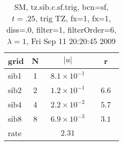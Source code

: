 \begin{table}[hbt]\tableFont %
\begin{center}
\begin{tabular}{|l|c|c|c|} \hline 
grid  & N &  $\vert u \vert$   & r \\ \hline 
                sib1 &     1 & ~$8.1\times10^{ -1}$~ &            \\ \hline
                sib2 &     2 & ~$1.2\times10^{ -1}$~ & ~$  6.6$~  \\ \hline
                sib4 &     4 & ~$2.2\times10^{ -2}$~ & ~$  5.7$~  \\ \hline
                sib8 &     8 & ~$6.9\times10^{ -3}$~ & ~$  3.1$~  \\ \hline
    rate             &       &       $2.31$         &        \\ \hline
\end{tabular}
\caption{SM, tz.sib.c.sf.trig, bcn=sf, $t=.25$, trig TZ, fx=1, fx=1, diss=.0, filter=1, filterOrder=6, $\lambda=1$, Fri Sep 11 20:20:45 2009}\label{table:tz.sib.c.sf.trig}
\end{center}
\end{table}

